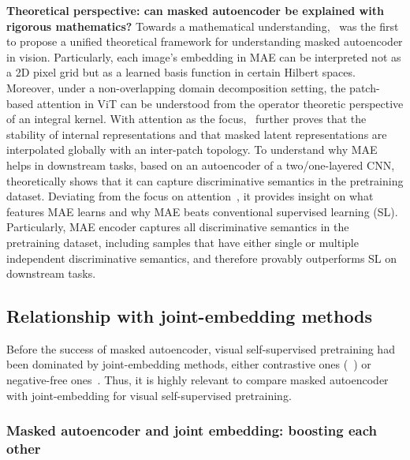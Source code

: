 \documentclass[10pt,journal,compsoc]{IEEEtran}
\begin{document}
\textbf{Theoretical perspective: can masked autoencoder be explained with rigorous mathematics?}
Towards a mathematical understanding,~\cite{cao2022understand} was the first to propose a unified theoretical
framework for understanding masked autoencoder in vision. Particularly, each image’s embedding in MAE can be interpreted not as a 2D pixel grid but as a learned basis function in certain Hilbert spaces. Moreover, under a non-overlapping domain decomposition setting, the patch-based attention in ViT can be understood from the operator theoretic perspective of an integral kernel. With attention as the focus,~\cite{cao2022understand} further proves that the stability of internal representations and that masked latent representations are interpolated globally with an inter-patch topology. To understand why MAE helps in downstream tasks, based on an autoencoder of a two/one-layered CNN,~\cite{pan2022towards} theoretically shows that it can capture discriminative semantics in the pretraining dataset. Deviating from the focus on attention~\cite{cao2022understand}, it provides insight on what features MAE learns
and why MAE beats conventional supervised learning (SL). Particularly, MAE encoder captures all discriminative semantics in the pretraining dataset, including samples that have either single or multiple independent discriminative semantics, and therefore provably outperforms SL on downstream tasks. 



\subsection{Relationship with joint-embedding methods} 

Before the success of masked autoencoder, visual self-supervised pretraining had been dominated by joint-embedding methods, either contrastive ones (~\cite{chen2020simple,chen2021mocov3}) or negative-free ones~\cite{grill2020bootstrap,caron2021emerging}. Thus, it is highly relevant to compare masked autoencoder with joint-embedding for visual self-supervised pretraining. 



\subsubsection{Masked autoencoder and joint embedding: boosting each other}
\end{document}
